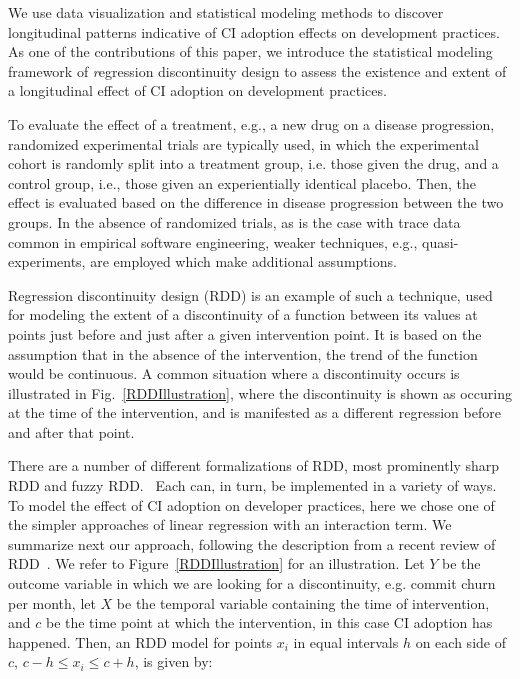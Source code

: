 We use data visualization and statistical modeling methods to discover longitudinal patterns indicative of CI adoption effects on development practices.
As one of the contributions of this paper, we introduce the statistical modeling framework of {\emph regression discontinuity design} to assess the existence and extent of a longitudinal effect of CI adoption on development practices.

To evaluate the effect of a treatment, e.g., a new drug on a disease progression, randomized experimental trials are typically used, in which the experimental cohort is randomly split into a treatment group, i.e. those given the drug, and a control group, i.e., those given an experientially identical placebo. Then, the effect is evaluated based on the difference in disease progression between the two groups.
In the absence of randomized trials, as is the case with trace data common in empirical software engineering, weaker techniques, e.g., quasi-experiments, are employed which make additional assumptions.

Regression discontinuity design (RDD) is an example of such a technique, used for modeling the extent of a discontinuity of a function between its values at points just before and just after a given intervention point. 
It is based on the assumption that in the absence of the intervention, the trend of the function would be continuous.
A common situation where a discontinuity occurs is illustrated in Fig.~\ref{RDDIllustration}, where the discontinuity is shown as occuring at the time of the intervention, and is manifested as a different regression before and after that point.

There are a number of different formalizations of RDD, most prominently sharp RDD and fuzzy RDD.~\cite{}
Each can, in turn, be implemented in a variety of ways.
To model the effect of CI adoption on developer practices, here we chose one of the simpler approaches of linear regression with an interaction term.
We summarize next our approach, following the description from a recent review of RDD~\cite{}. We refer to Figure~\ref{RDDIllustration} for an illustration.
Let $Y$ be the outcome variable in which we are looking for a discontinuity, e.g. commit churn per month, let $X$ be the temporal variable containing the time of intervention, and $c$ be the time point at which the intervention, in this case CI adoption has happened.
Then, an RDD model for points $x_i$ in equal intervals $h$ on each side of $c$, $c-h \le x_i \le c+h$, is given by:

